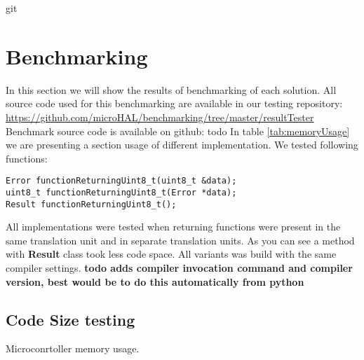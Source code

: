 git \documentclass{article}
\let\Oldsection\section
\renewcommand{\section}{\FloatBarrier\Oldsection}
\let\Oldsubsection\subsection
\renewcommand{\subsection}{\FloatBarrier\Oldsubsection}
\begin{document}
\section{Benchmarking}
In this section we will show the results of benchmarking of each solution.\newline
All source code used for this benchmarking are available in our testing repository: \url{https://github.com/microHAL/benchmarking/tree/master/resultTester}
Benchmark source code is available on github: todo\newline
In table \ref{tab:memoryUsage} we are presenting a section usage of different implementation. We tested following functions:
\begin{lstlisting}
Error functionReturningUint8_t(uint8_t &data);
uint8_t functionReturningUint8_t(Error *data);
Result functionReturningUint8_t();
\end{lstlisting}

All implementations were tested when returning functions were present in the same translation unit and in separate translation units. As you can see a method with \textbf{Result} class took less code space. All variants was build with the same compiler settings.\newline\newline
\textbf{todo adds compiler invocation command and compiler version, best would be to do this automatically from python}
\newline\newline

\subsection{Code Size testing}

\begin{table}[!h]
\centering
\caption{Microconrtoller memory usage.\label{tab:memoryUsage}}
\loadedtable
\pgfplotstabletypeset[
	set thousands separator={\,},
	col sep=&,
	row sep=\\,
	columns={implementation,translation unit,bss,data,text,dec},
	column type/.add={|}{},%
	assign column name/.style={/pgfplots/table/column name={\textbf{#1}}},			
	every head row/.style={before row={
		\hline		
		\multicolumn{2}{|c|}{\textbf{Test configuration}} & \multicolumn{4}{c|}{\textbf{Section size}}\\
		\hline
		},
		after row=\hline
	},
	every last row/.style={after row=\hline},
	every last column/.style={column type/.add={}{|}},
	columns/implementation/.style={
		string type,
		assign cell content/.code={
			\ifnum\pgfplotstablerow=0
				\pgfkeyssetvalue{/pgfplots/table/@cell content}{\multirow{2}{*}{##1}}%
			\fi		
			\ifnum\pgfplotstablerow=2
				\pgfkeyssetvalue{/pgfplots/table/@cell content}{\multirow{2}{*}{##1}}%
			\fi	
			\ifnum\pgfplotstablerow=4
				\pgfkeyssetvalue{/pgfplots/table/@cell content}{\multirow{2}{*}{##1}}%
			\fi	
		},
	},
	columns/translation unit/.style={string type},
	every even row/.style={before row={\hline}},%
]\loadedtable
\end{table}
\end{document}
